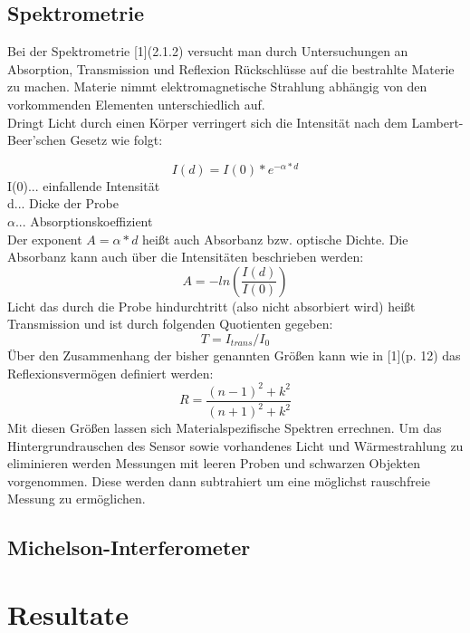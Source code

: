 \documentclass[12pt,a4paper]{article}
\begin{document}
\begin{multicols}{2}
\subsection{Spektrometrie}
Bei der Spektrometrie [1](2.1.2) versucht man durch Untersuchungen an Absorption, Transmission und Reflexion Rückschlüsse auf die bestrahlte Materie zu machen. Materie nimmt elektromagnetische Strahlung abhängig von den vorkommenden Elementen unterschiedlich auf. \\
Dringt Licht durch einen Körper verringert sich die Intensität nach dem Lambert-Beer'schen Gesetz wie folgt:

$$I(d) = I(0) * e^{-\alpha *d}$$
I(0)... einfallende Intensität\\
d... Dicke der Probe\\
$\alpha$... Absorptionskoeffizient\\
Der exponent $A = \alpha * d$ heißt auch Absorbanz bzw. optische Dichte. Die Absorbanz kann auch über die Intensitäten beschrieben werden:
$$A = - ln\left( \frac{I(d)}{I(0)} \right)$$
Licht das durch die Probe hindurchtritt (also nicht absorbiert wird) heißt Transmission und ist durch folgenden Quotienten gegeben:\\
$$T = I_{trans}/I_0$$
Über den Zusammenhang der bisher genannten Größen kann wie in [1](p. 12) das Reflexionsvermögen definiert werden:
$$R = \frac{(n-1)^2 + k^2}{(n+1)^2 + k^2}$$
Mit diesen Größen lassen sich Materialspezifische Spektren errechnen. Um das Hintergrundrauschen des Sensor sowie vorhandenes Licht und Wärmestrahlung zu eliminieren werden Messungen mit leeren Proben und schwarzen Objekten vorgenommen. Diese werden dann subtrahiert um eine möglichst rauschfreie Messung zu ermöglichen.



\subsection{Michelson-Interferometer}






\section{Resultate}

\end{multicols}
\end{document}
